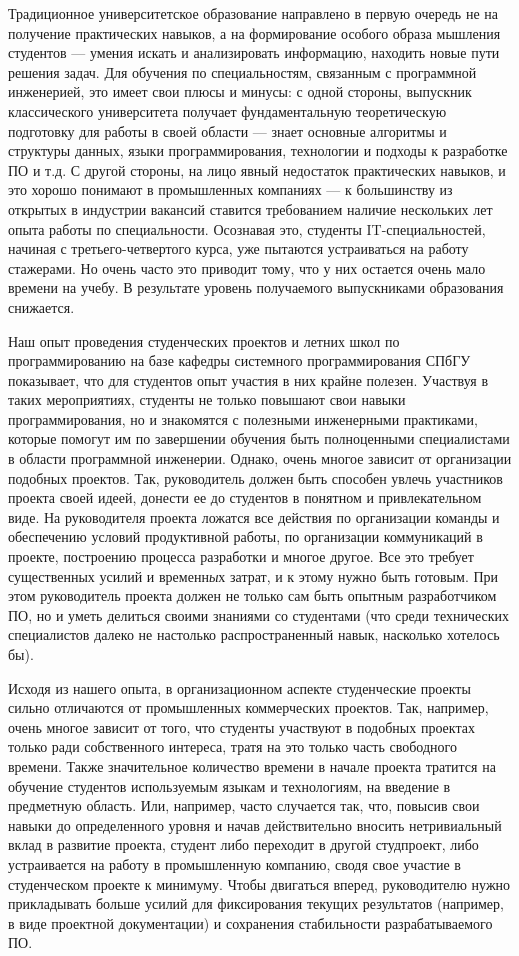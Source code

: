 \documentclass[a4paper]{article}
\begin{document}
Традиционное университетское образование направлено в первую очередь не на получение практических навыков, а на формирование особого образа мышления студентов --- умения искать и анализировать информацию, находить новые пути решения задач. Для обучения по специальностям, связанным с программной инженерией, это имеет свои плюсы и минусы: с одной стороны, выпускник классического университета получает фундаментальную теоретическую подготовку для работы в своей области --- знает основные алгоритмы и структуры данных, языки программирования, технологии и подходы к разработке ПО и т.д. С другой стороны, на лицо явный недостаток практических навыков, и это хорошо понимают в промышленных компаниях --- к большинству из открытых в индустрии вакансий ставится требованием наличие нескольких лет опыта работы по специальности. Осознавая это, студенты IT-специальностей, начиная с третьего-четвертого курса, уже пытаются устраиваться на работу стажерами. Но очень часто это приводит тому, что у них остается очень мало времени на учебу. В результате уровень получаемого выпускниками образования снижается.

Наш опыт проведения студенческих проектов и летних школ по программированию на базе кафедры системного программирования СПбГУ показывает, что для студентов опыт участия в них крайне полезен. Участвуя в таких мероприятиях, студенты не только повышают свои навыки программирования, но и знакомятся с полезными инженерными практиками, которые помогут им по завершении обучения быть полноценными специалистами в области программной инженерии. Однако, очень многое зависит от организации подобных проектов. Так, руководитель должен быть способен увлечь участников проекта своей идеей, донести ее до студентов в понятном и привлекательном виде. На руководителя проекта ложатся все действия по организации команды и обеспечению условий продуктивной работы, по организации коммуникаций в проекте, построению процесса разработки и многое другое. Все это требует существенных усилий и временн\textit{ы}х затрат, и к этому нужно быть готовым. При этом руководитель проекта должен не только сам быть опытным разработчиком ПО, но и уметь делиться своими знаниями со студентами (что среди технических специалистов далеко не настолько распространенный навык, насколько хотелось бы). 

Исходя из нашего опыта, в организационном аспекте студенческие проекты сильно отличаются от промышленных коммерческих проектов. Так, например, очень многое зависит от того, что студенты участвуют в подобных проектах только ради собственного интереса, тратя на это только часть свободного времени. Также значительное количество времени в начале проекта тратится на обучение студентов используемым языкам и технологиям, на введение в предметную область. Или, например, часто случается так, что, повысив свои навыки до определенного уровня и начав действительно вносить нетривиальный вклад в развитие проекта, студент либо переходит в другой студпроект, либо устраивается на работу в промышленную компанию, сводя свое участие в студенческом проекте к минимуму. Чтобы двигаться вперед, руководителю нужно прикладывать больше усилий для фиксирования текущих результатов (например, в виде проектной документации) и сохранения стабильности разрабатываемого ПО. 
\end{document}
